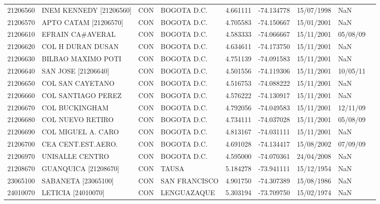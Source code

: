 \begin{landscape}
\begin{longtable}{lp{4cm}lp{3cm}lrrll}
   21206560 &     INEM KENNEDY [21206560] &  CON &       BOGOTA D.C. &  4.661111 & -74.134778 &  15/07/1998 &         NaN \\
   21206570 &       APTO CATAM [21206570] &  CON &       BOGOTA D.C. &  4.705583 & -74.150667 &  15/01/2001 &         NaN \\
   21206610 &            EFRAIN CA\#AVERAL &  CON &       BOGOTA D.C. &  4.583333 & -74.066667 &  15/11/2001 &    05/08/09 \\
   21206620 &           COL H DURAN DUSAN &  CON &       BOGOTA D.C. &  4.634611 & -74.173750 &  15/11/2001 &         NaN \\
   21206630 &          BILBAO MAXIMO POTI &  CON &       BOGOTA D.C. &  4.751139 & -74.091583 &  15/11/2001 &         NaN \\
   21206640 &         SAN JOSE [21206640] &  CON &       BOGOTA D.C. &  4.501556 & -74.119306 &  15/11/2001 &    10/05/11 \\
   21206650 &            COL SAN CAYETANO &  CON &       BOGOTA D.C. &  4.516753 & -74.088222 &  15/11/2001 &         NaN \\
   21206660 &          COL SANTIAGO PEREZ &  CON &       BOGOTA D.C. &  4.576222 & -74.130917 &  15/11/2001 &         NaN \\
   21206670 &              COL BUCKINGHAM &  CON &       BOGOTA D.C. &  4.792056 & -74.049583 &  15/11/2001 &    12/11/09 \\
   21206680 &            COL NUEVO RETIRO &  CON &       BOGOTA D.C. &  4.734111 & -74.037028 &  15/11/2001 &    05/08/09 \\
   21206690 &          COL MIGUEL A. CARO &  CON &       BOGOTA D.C. &  4.813167 & -74.031111 &  15/11/2001 &         NaN \\
   21206700 &          CEA CENT.EST.AERO. &  CON &       BOGOTA D.C. &  4.691028 & -74.134417 &  15/08/2002 &    07/09/09 \\
   21206970 &             UNISALLE CENTRO &  CON &       BOGOTA D.C. &  4.595000 & -74.070361 &  24/04/2008 &         NaN \\
   21208670 &        GUANQUICA [21208670] &  CON &             TAUSA &  5.184278 & -73.941111 &  15/12/1954 &         NaN \\
   23065100 &         SABANETA [23065100] &  CON &     SAN FRANCISCO &  4.901750 & -74.307389 &  15/08/1986 &         NaN \\
   24010070 &          LETICIA [24010070] &  CON &       LENGUAZAQUE &  5.303194 & -73.709750 &  15/02/1974 &         NaN \\

\end{longtable}
\end{landscape}

